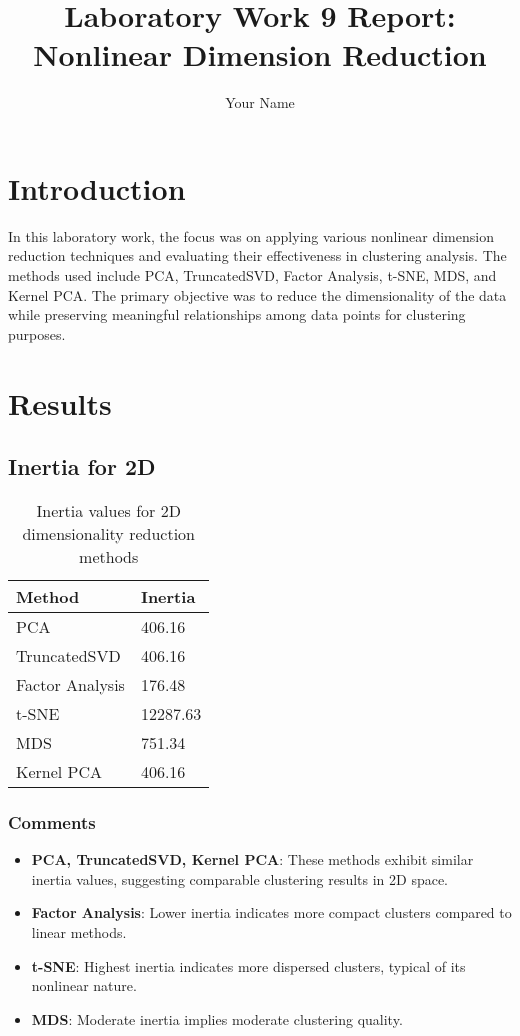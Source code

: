 \documentclass{article}
\title{Laboratory Work 9 Report: Nonlinear Dimension Reduction}
\author{Your Name}
\begin{document}
\maketitle

\section{Introduction}
In this laboratory work, the focus was on applying various nonlinear dimension reduction techniques and evaluating their effectiveness in clustering analysis. The methods used include PCA, TruncatedSVD, Factor Analysis, t-SNE, MDS, and Kernel PCA. The primary objective was to reduce the dimensionality of the data while preserving meaningful relationships among data points for clustering purposes.

\section{Results}

\subsection{Inertia for 2D}

\begin{table}[H]
    \centering
    \begin{tabular}{|l|l|}
    \hline
    \textbf{Method} & \textbf{Inertia} \\ \hline
    PCA & 406.16 \\ \hline
    TruncatedSVD & 406.16 \\ \hline
    Factor Analysis & 176.48 \\ \hline
    t-SNE & 12287.63 \\ \hline
    MDS & 751.34 \\ \hline
    Kernel PCA & 406.16 \\ \hline
    \end{tabular}
    \caption{Inertia values for 2D dimensionality reduction methods}
    \label{tab:inertia_2d}
\end{table}

\subsubsection{Comments}
\begin{itemize}
    \item \textbf{PCA, TruncatedSVD, Kernel PCA}: These methods exhibit similar inertia values, suggesting comparable clustering results in 2D space.
    \item \textbf{Factor Analysis}: Lower inertia indicates more compact clusters compared to linear methods.
    \item \textbf{t-SNE}: Highest inertia indicates more dispersed clusters, typical of its nonlinear nature.
    \item \textbf{MDS}: Moderate inertia implies moderate clustering quality.
\end{itemize}
\end{document}
